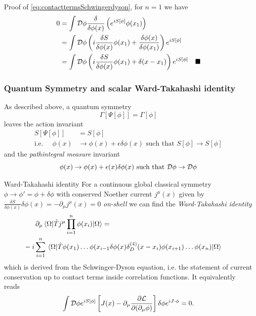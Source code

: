 Proof of \ref{eq:contacttermsSchwingerdyson}, for $n=1$ we have
\begin{align*}
	0&= \int \mathcal{D} \phi \frac{\delta }{\delta \phi(x)} \left(e^{i S[\phi]} \phi(x_1)\right)\\
	&= \int \mathcal{D} \phi \left(i \frac{\delta S}{\delta \phi(x)} \phi(x_1)+ \frac{\delta \phi(x)}{\delta \phi(x_1)}\right)e^{i S[\phi]}\\
	&= \int \mathcal{D} \phi \left(i \frac{\delta S}{\delta \phi(x)} \phi(x_1)+ \delta(x-x_1)\right)e^{i S[\phi]}\quad \blacksquare
\end{align*}









\subsubsection{Quantum Symmetry and scalar Ward-Takahashi identity}
\begin{mybox}{}
	As described above, a quantum symmetry
	\begin{equation}
		\Gamma[\Psi[\phi]] = \Gamma[\phi] 
	\end{equation}
	leaves the action invariant
	\begin{align}
		S[\Psi[\phi]] &= S[\phi] \\
		\text{i.e. } \quad \phi(x) &\rightarrow \phi(x)+\epsilon \delta \phi(x) \text{ such that } S[\phi]  \rightarrow S[\phi]
	\end{align}
and the \emph{pathintegral measure} invariant
\begin{equation}
	\phi(x) \rightarrow \phi(x) + \epsilon(x) \delta \phi(x) \text{  such that } \mathcal{D}\phi \rightarrow \mathcal{D} \phi
\end{equation}
\end{mybox}
\begin{mybox}{Ward-Takahashi identity}
For a continuous global classical symmetry $\phi \rightarrow \phi' = \phi + \delta \phi$ with conserved Noether current $j^{\mu} (x)$ given by $\frac{\delta S}{\delta \phi(x)}
\delta \phi(x) = - \partial_{\mu} j^{\mu} (x) =0$ \emph{on-shell} we can find the \emph{Ward-Takahashi identity}
\begin{align}
	&\partial_{\mu} \expval{\hat{T} j^{\mu} \prod_{i=1}^{n} \phi(x_i) }{\Omega} = \\
	&\hspace{-0.6cm}-i \sum_{i=1}^{n} \expval{\hat{T} \phi(x_1) \dots \phi(x_{i-1} \delta \phi(x) \delta^{(4)}_D(x-x_i) \phi(x_{i+1}) \dots \phi(x_n) }{\Omega}
\end{align}
which is derived from the Schwinger-Dyson equation, i.e. the statement of current conservation up to contact terms inside correlation functions.
It equivalently reads
\begin{equation}
	\label{eq:wardtakahashi}
	\int \mathcal{D} \phi e^{i S[\phi]} \left[J(x) - \partial_\mu \frac{\partial \mathcal{L}}{\partial (\partial_\mu \phi)}\right] \delta \phi e^{i J\cdot \phi} =0.
\end{equation}
\end{mybox}
